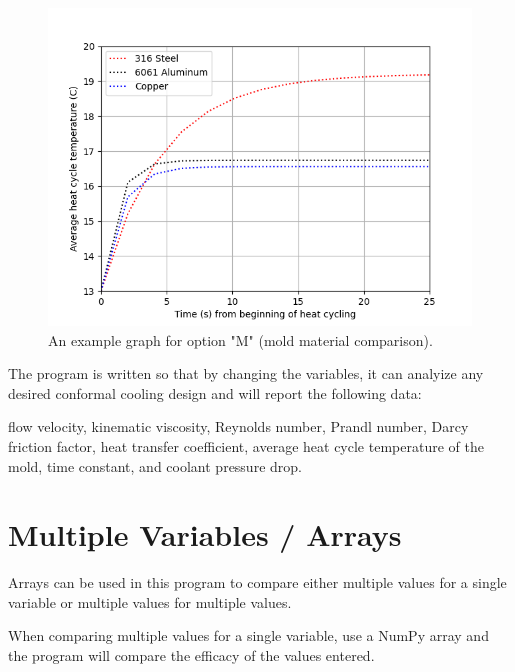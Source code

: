 \documentclass[a4paper,12pt]{article}
\begin{document}
\medskip
\begin{center}
\begin{figure}
\includegraphics[width=\linewidth]{paccman-example-graph.png}
\caption{An example graph for option "M" (mold material comparison). }
\end{figure}
\end{center}

The program is written so that by changing the variables, it can analyize any desired conformal cooling design and will report the following data: 
\begin{adjustwidth}{1cm}{}

flow velocity, kinematic viscosity, Reynolds number, Prandl number, Darcy friction factor, heat transfer coefficient, average heat cycle temperature of the mold, time constant, and coolant pressure drop.

\end{adjustwidth}
\clearpage

\section*{Multiple Variables / Arrays}

Arrays can be used in this program to compare either multiple values for a single variable or multiple values for multiple values.

\medskip

When comparing multiple values for a single variable, use a NumPy array and the program will compare the efficacy of the values entered.

\medskip 
\end{document}
